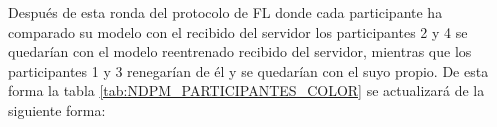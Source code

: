 Después de esta ronda del protocolo de FL donde cada participante ha comparado su modelo con el recibido del servidor los participantes 2 y 4 se quedarían con el modelo reentrenado recibido del servidor, mientras que los participantes 1 y 3 renegarían de él y se quedarían con el suyo propio. De esta forma la tabla \ref{tab:NDPM_PARTICIPANTES_COLOR} se actualizará de la siguiente forma:
{
    \let\OldTabular\tabular%
    \let\OldEndTabular\endtabular%
    \renewenvironment{tabular}{\StartTableHeader\OldTabular}{\OldEndTabular\StartTableHeader}%

    \newcommand*{\MinNumber}{0.125}%
    \newcommand*{\MidNumber}{0.165} %
    \newcommand*{\MaxNumber}{0.205}%

    \newcommand{\ApplyGradient}[1]{%
    \iftoggle{inTableHeader}{#1}{
        \ifdim #1 pt > \MidNumber pt
            \pgfmathsetmacro{\PercentColor}{max(min(100.0*(#1 - \MidNumber)/(\MaxNumber-\MidNumber),100.0),0.00)} %
            \hspace{-0.33em}\colorbox{red!\PercentColor!yellow}{#1}
        \else
            \pgfmathsetmacro{\PercentColor}{max(min(100.0*(\MidNumber - #1)/(\MidNumber-\MinNumber),100.0),0.00)} %
            \hspace{-0.33em}\colorbox{green!\PercentColor!yellow}{#1}
        \fi
    }}

    \renewcommand{\arraystretch}{0}
    \setlength{\fboxsep}{3mm} %
    \setlength{\tabcolsep}{0pt}


}

